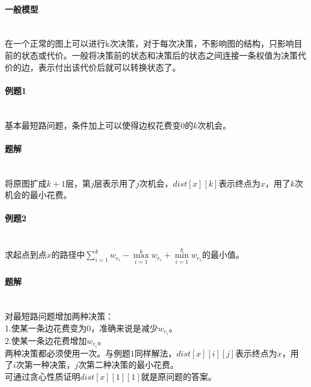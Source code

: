 \paragraph{一般模型}~{}
\\
在一个正常的图上可以进行k次决策，对于每次决策，不影响图的结构，只影响目前的状态或代价。一般将决策前的状态和决策后的状态之间连接一条权值为决策代价的边，表示付出该代价后就可以转换状态了。\\
\paragraph{例题1}~{}
\\
基本最短路问题，条件加上可以使得边权花费变$0$的$k$次机会。
\paragraph{题解}~{}
\\
将原图扩成$k+1$层，第$j$层表示用了$j$次机会，$dist[x][k]$表示终点为$x$，用了$k$次机会的最小花费。\\
\paragraph{例题2}~{}
\\
求起点到点$x$的路径中$\sum\limits_{i=1}^{k}{w_{e_i}} - \max\limits_{i=1}^{k}{w_{e_i}} + \min\limits_{i=1}^{k}{w_{e_i}}$的最小值。
\paragraph{题解}~{}
\\
对最短路问题增加两种决策：\\
1.使某一条边花费变为$0$，准确来说是减少$w_{e_i}$。\\
2.使某一条边花费增加$w_{e_i}$。\\
两种决策都必须使用一次。与例题1同样解法，$dist[x][i][j]$表示终点为$x$，用了$i$次第一种决策，$j$次第二种决策的最小花费。\\
可通过贪心性质证明$dist[x][1][1]$就是原问题的答案。